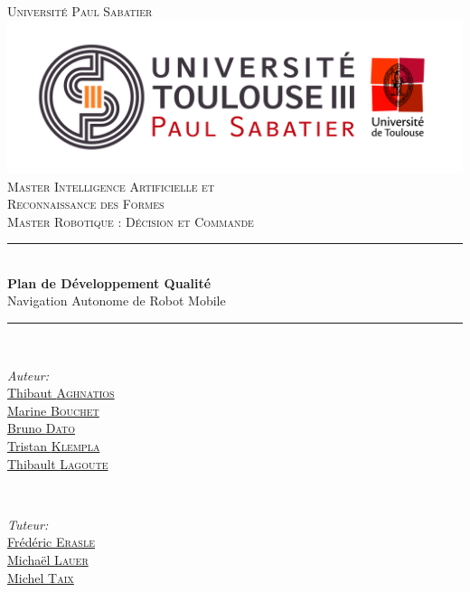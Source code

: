 \documentclass[10pt,a4paper]{article}
\begin{document}
\begin{titlepage}

\newcommand{\HRule}{\rule{\linewidth}{0.5mm}} 

\center

\textsc{\Large Université Paul Sabatier}\\[1cm] 
\includegraphics[scale=0.3]{UPS.jpg}\\[0.6cm] 


\textsc{Master Intelligence Artificielle et \\ 
Reconnaissance des Formes \\ Master Robotique : Décision et Commande}\\[3cm] 

\HRule \\[0.4cm]
{ \huge \bfseries Plan de Développement Qualité}\\[0.4cm] 
\LARGE Navigation Autonome de Robot Mobile

\HRule \\[1.5cm]
 

\begin{minipage}{0.4\textwidth}
\begin{flushleft} \large
\emph{Auteur:}\\
\href{mailto:thibaut.aghnatios@laposte.net}{Thibaut \textsc{Aghnatios} }  \\
\href{mailto:bouchetmarinee@gmail.com}{Marine \textsc{Bouchet} } \\
\href{mailto:bruno.dato.meneses@gmail.com}{Bruno \textsc{Dato} } \\
\href{mailto:klempka.tristan@gmail.com}{Tristan \textsc{Klempla} } \\
\href{mailto:lagoute.31@gmail.com}{Thibault \textsc{Lagoute} }  
\end{flushleft}
\end{minipage}
~
\begin{minipage}{0.4\textwidth}
\begin{flushright} \large
\emph{Tuteur:} \\
\href{mailto:bouchetmarinee@gmail.com}{Frédéric \textsc{Erasle}}\\
\href{mailto:michael.lauer@laas.fr}{Michaël \textsc{Lauer}} \\
\href{mailto:bouchetmarinee@gmail.com}{Michel \textsc{Taix}}
\end{flushright}
\end{minipage}\\[1cm]

 

\end{titlepage}
\end{document}
